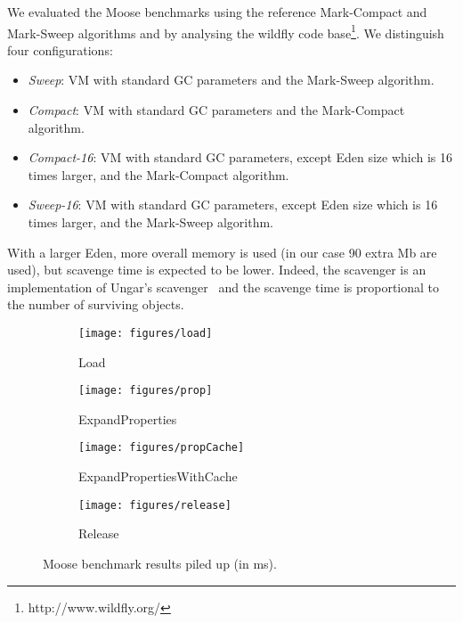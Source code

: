 \documentclass[10pt, sigplan]{acmart}
\begin{document}
We evaluated the Moose benchmarks using the reference Mark-Compact and Mark-Sweep algorithms and by analysing the wildfly code base\footnote{http://www.wildfly.org/}. We distinguish four configurations:
\begin{itemize}
\item \emph{Sweep}: VM with standard GC parameters and the Mark-Sweep algorithm.
\item \emph{Compact}: VM with standard GC parameters and the Mark-Compact algorithm.
\item \emph{Compact-16}: VM with standard GC parameters, except Eden size which is 16 times larger, and the Mark-Compact algorithm.
\item \emph{Sweep-16}: VM with standard GC parameters, except Eden size which is 16 times larger, and the Mark-Sweep algorithm.
\end{itemize}
With a larger Eden, more overall memory is used (in our case 90 extra Mb are used), but scavenge time is expected to be lower. Indeed, the scavenger is an implementation of Ungar's scavenger~\cite{Scavenger} and the scavenge time is proportional to the number of surviving objects.

%
\begin{figure*}[thb]
	\centering
    
    \begin{subfigure}[b]{.48\textwidth}
	\texttt{[image: figures/load]} 
	\caption{Load\vspace{0.2cm}}
   	\end{subfigure}\hspace{0.03\textwidth}%
   	\begin{subfigure}[b]{.48\textwidth}
	\texttt{[image: figures/prop]} 
	\caption{ExpandProperties\vspace{0.2cm}}
   	\end{subfigure}	
	\begin{subfigure}[b]{.48\textwidth}
	\texttt{[image: figures/propCache]} 
	\caption{ExpandPropertiesWithCache}
	\end{subfigure}\hspace{0.03\textwidth}%
	   	\begin{subfigure}[b]{.48\textwidth}
	\texttt{[image: figures/release]} 
	\caption{Release}
   	\end{subfigure}

   	   	    	
\caption{Moose benchmark results piled up (in ms).} \label{MooseRes1}
\end{figure*}
\end{document}
